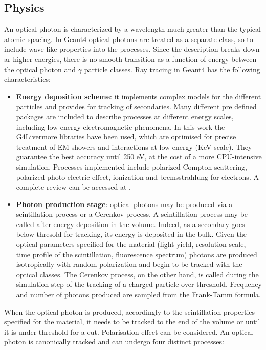 \subsection{Physics}
An optical photon is characterized by a wavelength much greater than the typical atomic spacing.
In Geant4 optical photons are treated as a separate class, so to include wave-like properties into the processes.
Since the description breaks down ar higher energies, there is no smooth transition as a function of energy between the optical photon and $\gamma$ particle classes.
Ray tracing in Geant4 has the following characteristics:
\begin{itemize}
\item \textbf{Energy deposition scheme}: it implements complex models for the different particles and provides for tracking of secondaries. Many different pre defined packages are included to describe processes at different energy scales, including low energy electromagnetic phenomena. 
In this work the G4Livermore libraries have been used, which are optimised for precise treatment of EM showers and interactions at low energy (KeV scale). They guarantee the best accuracy until 250 eV, at the cost of a more CPU-intensive simulation. Processes implemented include polarized Compton scattering, polarized photo electric effect, ionization and bremsstrahlung for electrons. A complete review can be accessed at \cite{Sempau2002}.
\item \textbf{Photon production stage}: optical photons may be produced via a scintillation process or a Cerenkov process. 
A scintillation process may be called after energy deposition in the volume. Indeed, as a secondary goes below thresold for tracking, its energy is deposited in the bulk. Given the optical parameters specified for the material (light yield, resolution scale, time profile of the scintillation, fluorescence spectrum) photons are produced isotropically with random polarization and begin to be tracked with the optical classes.
The Cerenkov process, on the other hand, is called during the simulation step of the tracking of a charged particle over threshold. Frequency and number of photons produced are sampled from the Frank-Tamm formula.
\end{itemize}
When the optical photon is produced, accordingly to the scintillation properties specified for the material, it needs to be tracked to the end of the volume or until it is under threshold for a cut. Polarisation effect can be considered. An optical photon is canonically tracked and can undergo four distinct processes:
